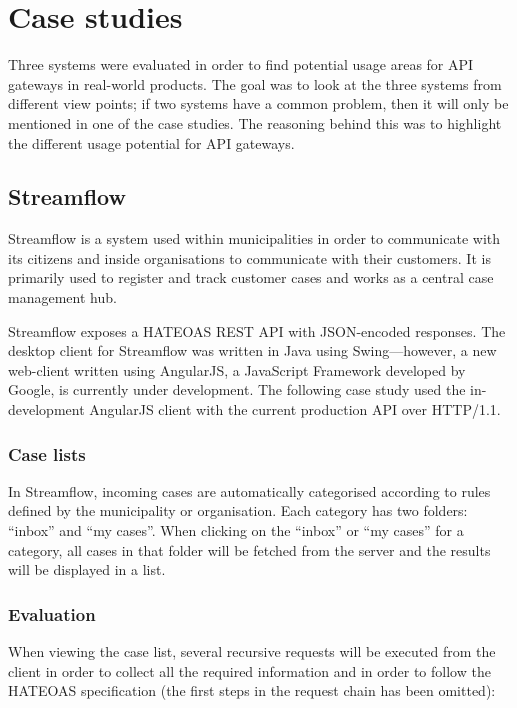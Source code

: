 \documentclass{cslthse-msc}
\begin{document}
\chapter{Case studies}

Three systems were evaluated in order to find potential usage areas for API gateways in real-world products. The goal was to look at the three systems from different view points; if two systems have a common problem, then it will only be mentioned in one of the case studies. The reasoning behind this was to highlight the different usage potential for API gateways.

\section{Streamflow}
Streamflow \cite{streamflow} is a system used within municipalities in order to communicate with its citizens and inside organisations to communicate with their customers. It is primarily used to register and track customer cases and works as a central case management hub.

Streamflow exposes a HATEOAS REST API with JSON-encoded responses. The desktop client for Streamflow was written in Java using Swing---however, a new web-client written using AngularJS, a JavaScript Framework developed by Google, is currently under development. The following case study used the in-development AngularJS client with the current production API over HTTP/1.1.

\subsection{Case lists}
In Streamflow, incoming cases are automatically categorised according to rules defined by the municipality or organisation. Each category has two folders: \enquote{inbox} and \enquote{my cases}. When clicking on the \enquote{inbox} or \enquote{my cases} for a category, all cases in that folder will be fetched from the server and the results will be displayed in a list.

\subsection{Evaluation}
When viewing the case list, several recursive requests will be executed from the client in order to collect all the required information and in order to follow the HATEOAS specification (the first steps in the request chain has been omitted):
\end{document}
